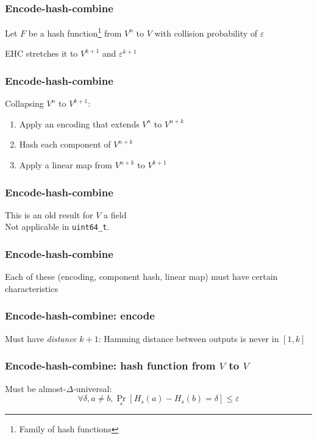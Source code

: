 \documentclass[xcolor=dvipsnames,hyperref={hidelinks}]{beamer}
\begin{document}
\begin{frame}
  \frametitle{Encode-hash-combine}
  Let $F$ be a hash function\footnote{Family of hash functions} from $V^n$ to $V$ with collision probability of $\varepsilon$
  \pause

  $ $ \\
  EHC stretches it to $V^{k+1}$ and $\varepsilon ^ {k+1}$
\end{frame}

\begin{frame}
  \frametitle{Encode-hash-combine}
  Collapsing $V^n$ to $V^{k+1}$:
  \begin{enumerate}
  \item Apply an encoding that extends $V^n$ to $V^{n+k}$
    \pause
  \item Hash each component of $V^{n+k}$
    \pause
  \item Apply a linear map from $V^{n+k}$ to $V^{k+1}$
  \end{enumerate}
\end{frame}

\begin{frame}[fragile]
  \frametitle{Encode-hash-combine}
  This is an old result for $V$ a field
  \pause
  \\
$ $\\
  Not applicable in \verb|uint64_t|.
\end{frame}

\begin{frame}
  \frametitle{Encode-hash-combine}
  Each of these (encoding, component hash, linear map) must have certain characteristics
\end{frame}

\begin{frame}
  \frametitle{Encode-hash-combine: encode}
  Must have {\em distance} $k+1$: Hamming distance between outputs is never in $[1,k]$
\end{frame}

\begin{frame}
  \frametitle{Encode-hash-combine: hash function from $V$ to $V$}
  Must be almost-$\Delta$-universal:
  \[
  \forall \delta, a \neq b, \Pr_s[H_s(a) - H_s(b) = \delta] \le \varepsilon
  \]
\end{frame}
\end{document}
